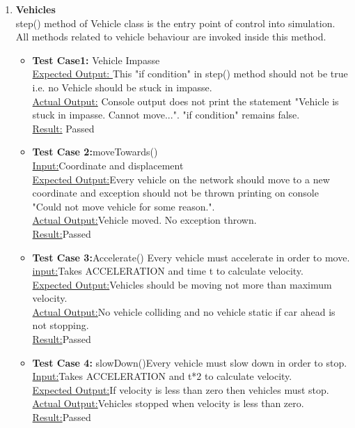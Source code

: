 \documentclass[11pt]{article}
\begin{document}
\begin{enumerate}
\begin{itemize}
\begin{enumerate}
	\item \textbf{Vehicles}\hfill \\
	step() method of Vehicle class is the entry point of control into simulation. All methods related to vehicle behaviour are invoked inside this method.\hfill \\

	\begin{itemize}
	\item \textbf{Test Case1:} Vehicle Impasse\hfill \\
		\underline{Expected Output: }This "if condition" in step() method should not be true i.e. no Vehicle 	should be stuck in impasse.\hfill \\
		\underline{Actual Output:} Console output does not print the statement "Vehicle is stuck in 		impasse. Cannot move...". "if condition" remains false.\hfill \\
		\underline{Result:} Passed\hfill \\

	\item \textbf{Test Case 2:}moveTowards()\hfill \\
		\underline{Input:}Coordinate and displacement\hfill \\
		\underline{Expected Output:}Every vehicle on the network should move to a new coordinate and exception should not be thrown printing on console "Could not move vehicle for some reason.".	\hfill \\
		 \underline{Actual Output:}Vehicle moved. No exception thrown.\hfill \\
		\underline{Result:}Passed
	
	\item \textbf{Test Case 3:}Accelerate() Every vehicle must accelerate in order to move.\hfill \\
		\underline{input:}Takes ACCELERATION and time t to calculate velocity.\hfill \\
		\underline{Expected Output:}Vehicles should be moving not more than maximum velocity.\hfill \\
		\underline{Actual Output:}No vehicle colliding and no vehicle static if car ahead is not stopping.\hfill \\
		\underline{Result:}Passed\hfill \\

	\item \textbf{Test Case 4:} slowDown()Every vehicle must slow down in order to stop.\hfill \\
		\underline{Input:}Takes ACCELERATION and t*2 to calculate velocity.\hfill \\
		\underline{Expected Output:}If velocity is less than zero then vehicles must stop.\hfill \\
		\underline{Actual Output:}Vehicles stopped when velocity is less than zero.\hfill \\
		\underline{Result:}Passed\hfill \\
	\end{itemize}


\end{enumerate}
\end{itemize}
\end{enumerate}
\end{document}
